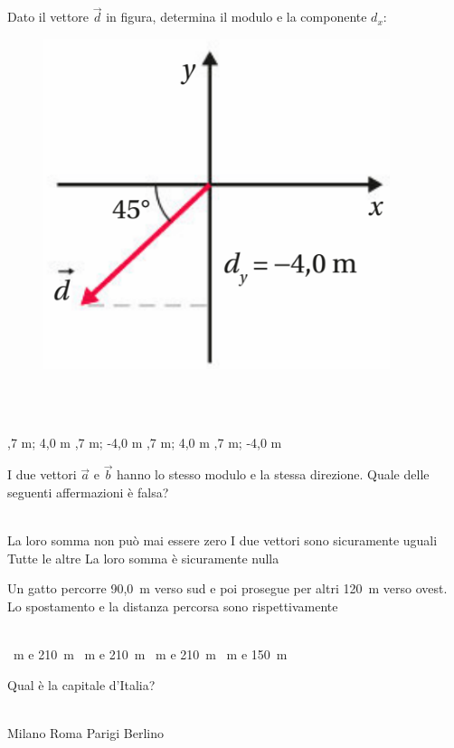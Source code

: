 \documentclass[a4paper,11pt]{exam}
\begin{document}
\begin{questions}
    
\question Dato il vettore $\vec{d}$ in figura, determina il modulo e la componente $d_x$: \begin{figure}[h!]   \begin{center}     \includegraphics[scale=0.35]{vettored.png}   \end{center} \end{figure}\\\
\begin{oneparchoices}
  ,7 m; 4,0 m
  \choice 5,7 m; -4,0 m
  ,7 m; 4,0 m
  \choice -5,7 m; -4,0 m
\end{oneparchoices}

    
\question I due vettori $\vec{a}$ e $\vec{b}$ hanno lo stesso modulo e la stessa direzione. Quale delle seguenti affermazioni è falsa?\\\
\begin{oneparchoices}
  \choice La loro somma non può mai essere zero
  \choice I due vettori sono sicuramente uguali
  \choice Tutte le altre
  \choice La loro somma è sicuramente nulla
\end{oneparchoices}

    
\question Un gatto percorre 90,0~m verso sud e poi prosegue per altri 120~m verso ovest. Lo spostamento e la distanza percorsa sono rispettivamente\\\
\begin{oneparchoices}
  ~m e 210~m
  \choice 150~m e 210~m
  \choice 30~m e 210~m
  \choice 210~m e 150~m
\end{oneparchoices}

    
\question Qual è la capitale d’Italia?\\\
\begin{oneparchoices}
  \choice Milano
  \choice Roma
  \choice Parigi
  \choice Berlino
\end{oneparchoices}


\end{questions}
\end{document}
